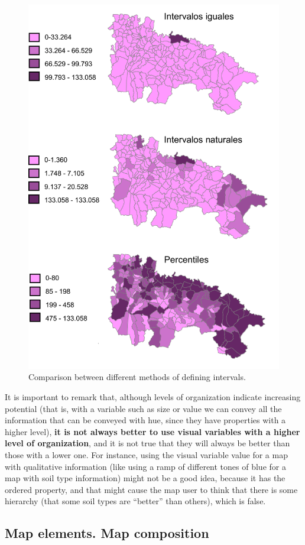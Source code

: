 \begin{itemize}
	\begin{figure}[!hbt]
	\centering
	\includegraphics[width=.7\columnwidth]{Visualization/IntervalClasses.pdf}
	\caption{\small Comparison between different methods of defining intervals.}
	\label{Fig:IntervalClasses} 
	\end{figure}


\end{itemize}


It is important to remark that, although levels of organization indicate increasing potential (that is, with a variable such as size or value we can convey all the information that can be conveyed with hue, since they have properties with a higher level), \textbf{it is not always better to use visual variables with a higher level of organization}, and it is not true that they will always be better than those with a lower one. For instance, using the visual variable value for a map with qualitative information (like using a ramp of different tones of blue for a map with soil type information) might not be a good idea, because it has the ordered property, and that might cause the map user to think that there is some hierarchy (that some soil types are ``better'' than others), which is false.


\subsection{Map elements. Map composition}

